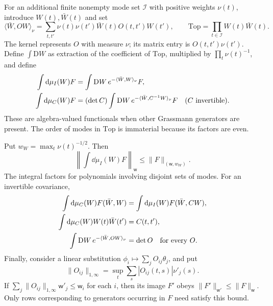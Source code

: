 For an additional finite nonempty mode set $\mathcal I$ with positive weights
$\nu(t)$, introduce $W(t),\bar W(t)$ and set
\[
 \langle\bar W,OW\rangle_\nu
    =\sum_{t,t'}\nu(t)\nu(t')\bar W(t)O(t,t')W(t'),
 \qquad \mathrm{Top}=\prod_{t\in\mathcal I}W(t)\bar W(t).
\]
The kernel represents $O$ with measure $\nu$; its matrix entry is
$O(t,t')\nu(t')$. Define $\int\mathrm DW$ as extraction of the
coefficient of $\mathrm{Top}$, multiplied by
$\prod_t\nu(t)^{-1}$, and define
\begin{align}
 \int\mathrm d\mu_I(W)F
     &=\int\mathrm DW\,e^{-\langle\bar W,W\rangle_\nu}F,
                                            \label{eq:weighted-Berezin}\\
 \int\mathrm d\mu_C(W)F
     &=(\det C)\int\mathrm DW\,
               e^{-\langle\bar W,C^{-1}W\rangle_\nu}F
                    \quad(C\text{ invertible}).\notag
\end{align}
These are algebra-valued functionals when other Grassmann generators
are present. The order of modes in $\mathrm{Top}$ is immaterial because
its factors are even.

\begin{proposition}\label{prop:weighted-Berezin-bounds}
Put $w_W=\max_t\nu(t)^{-1/2}$. Then
\begin{equation}\label{eq:weighted-integration-bound}
 \left\|\int\dd\mu_I(W)F\right\|_{\mathsf w}
                  \le\|F\|_{(\mathsf w,w_W)}.
\end{equation}
The integral factors for polynomials involving disjoint sets of modes.
For an invertible covariance,
\begin{align}
 \int\mathrm d\mu_C(W)F(\bar W,W)
     &=\int\mathrm d\mu_I(W)F(\bar W,CW),\label{eq:covariance-substitution}\\
 \int\mathrm d\mu_C(W)W(t)\bar W(t')&=C(t,t'),\notag\\
 \int\mathrm DW\,e^{-\langle\bar W,OW\rangle_\nu}
     &=\det O\quad\text{for every }O.\label{eq:weighted-determinant}
\end{align}
Finally, consider a linear substitution
$\phi_i\mapsto\sum_jO_{ij}\theta_j$, and put
\[
 \|O_{ij}\|_{1,\infty}
     =\sup_t\sum_s|O_{ij}(t,s)|\nu'_j(s).
\]
If $\sum_j\|O_{ij}\|_{1,\infty}\mathsf w'_j\le\mathsf w_i$ for
each $i$, then its image $F'$ obeys
$\|F'\|_{\mathsf w'}\le\|F\|_{\mathsf w}$.
Only rows corresponding to generators occurring in $F$ need satisfy
this bound.
\end{proposition}

